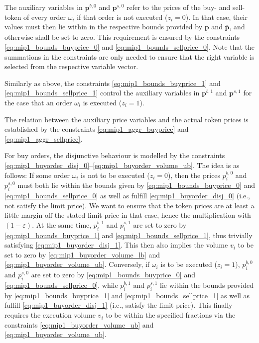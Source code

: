 \documentclass[11pt,parskip=full]{scrartcl}%
\newcommand*{\ie}{i.e., }
\begin{document}
The auxiliary variables in $ \mathbf{p}^{b,0} $ and $ \mathbf{p}^{s,0} $ refer to the prices of the
buy- and sell-token of every order $ \omega_i $ if that order is not executed ($ z_i = 0 $).
In that case, their values must then lie within in the respective bounds provided by
$ \underline{\mathbf{p}} $ and $ \overline{\mathbf{p}} $, and otherwise shall be set to zero.
This requirement is ensured by the constraints \eqref{eq:mip1_bounds_buyprice_0} and
\eqref{eq:mip1_bounds_sellprice_0}.
Note that the summations in the constraints are only needed to ensure that the right variable is
selected from the respective variable vector.

Similarly as above, the constraints \eqref{eq:mip1_bounds_buyprice_1} and
\eqref{eq:mip1_bounds_sellprice_1} control the auxiliary variables in $ \mathbf{p}^{b,1} $ and $
\mathbf{p}^{s,1} $ for the case that an order $ \omega_i $ is executed ($ z_i = 1 $).

The relation between the auxiliary price variables and the actual token prices is established by
the constraints \eqref{eq:mip1_aggr_buyprice} and \eqref{eq:mip1_aggr_sellprice}.

For buy orders, the disjunctive behaviour is modelled by the constraints
\eqref{eq:mip1_buyorder_disj_0}--\eqref{eq:mip1_buyorder_volume_ub}.
The idea is as follows:
If some order $ \omega_i $ is not to be executed ($ z_i = 0 $), then the prices
$ p_i^{b,0} $ and $ p_i^{s,0} $ must both lie within the bounds given by
\eqref{eq:mip1_bounds_buyprice_0} and \eqref{eq:mip1_bounds_sellprice_0} as well as fulfill
\eqref{eq:mip1_buyorder_disj_0} (\ie not satisfy the limit price).
We want to ensure that the token prices are at least a little margin off the stated limit price in
that case, hence the multiplication with $ (1-\varepsilon) $.
At the same time, $ p_i^{b,1} $ and $ p_i^{s,1} $ are set to zero by
\eqref{eq:mip1_bounds_buyprice_1} and \eqref{eq:mip1_bounds_sellprice_1}, thus trivially satisfying
\eqref{eq:mip1_buyorder_disj_1}.
This then also implies the volume $ v_i $ to be set to zero by \eqref{eq:mip1_buyorder_volume_lb}
and \eqref{eq:mip1_buyorder_volume_ub}.
Conversely, if $ \omega_i $ is to be executed ($ z_i = 1 $), $ p_i^{b,0} $ and $ p_i^{s,0} $ are
set to zero by \eqref{eq:mip1_bounds_buyprice_0} and \eqref{eq:mip1_bounds_sellprice_0}, while
$ p_i^{b,1} $ and $ p_i^{s,1} $ lie within the bounds provided by \eqref{eq:mip1_bounds_buyprice_1}
and \eqref{eq:mip1_bounds_sellprice_1} as well as fulfill \eqref{eq:mip1_buyorder_disj_1}
(\ie satisfy the limit price).
This finally requires the execution volume $ v_i $ to be within the specified fractions via the
constraints \eqref{eq:mip1_buyorder_volume_ub} and \eqref{eq:mip1_buyorder_volume_ub}.
\end{document}
